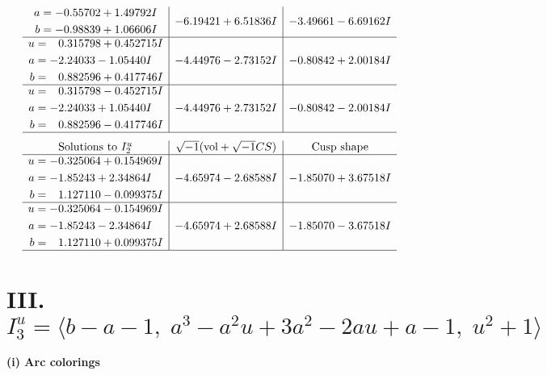 \documentclass[1p]{elsarticle_modified}
\theoremstyle{definition}
\newcommand{\I}{\sqrt{-1}}
\begin{document}
$$\begin{array}{c|c|c}
\begin{aligned}
a &= -0.55702 + 1.49792 I \\
b &= -0.98839 + 1.06606 I\end{aligned}
 & -6.19421 + 6.51836 I & -3.49661 - 6.69162 I \\ \hline\begin{aligned}
u &= \phantom{-}0.315798 + 0.452715 I \\
a &= -2.24033 - 1.05440 I \\
b &= \phantom{-}0.882596 + 0.417746 I\end{aligned}
 & -4.44976 - 2.73152 I & -0.80842 + 2.00184 I \\ \hline\begin{aligned}
u &= \phantom{-}0.315798 - 0.452715 I \\
a &= -2.24033 + 1.05440 I \\
b &= \phantom{-}0.882596 - 0.417746 I\end{aligned}
 & -4.44976 + 2.73152 I & -0.80842 - 2.00184 I\\
 \hline 
 \end{array}$$\newpage$$\begin{array}{c|c|c}  
\text{Solutions to }I^u_{2}& \I (\text{vol} + \sqrt{-1}CS) & \text{Cusp shape}\\
 \hline 
\begin{aligned}
u &= -0.325064 + 0.154969 I \\
a &= -1.85243 + 2.34864 I \\
b &= \phantom{-}1.127110 - 0.099375 I\end{aligned}
 & -4.65974 - 2.68588 I & -1.85070 + 3.67518 I \\ \hline\begin{aligned}
u &= -0.325064 - 0.154969 I \\
a &= -1.85243 - 2.34864 I \\
b &= \phantom{-}1.127110 + 0.099375 I\end{aligned}
 & -4.65974 + 2.68588 I & -1.85070 - 3.67518 I\\
 \hline 
 \end{array}$$\newpage\newpage\renewcommand{\arraystretch}{1}
\centering \section*{III. $I^u_{3}= \langle b- a-1,\;a^3- a^2 u+3 a^2-2 a u+a-1,\;u^2+1 \rangle$}
\flushleft \textbf{(i) Arc colorings}\\
\end{document}
